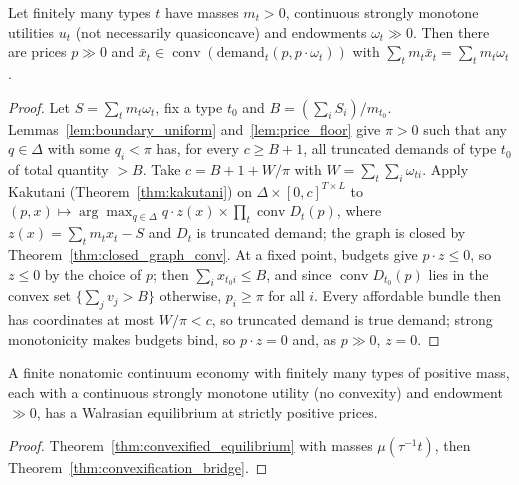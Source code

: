 \begin{theorem}
\label{thm:convexified_equilibrium}
\leanok
{}
Let finitely many types $t$ have masses $m_t > 0$, continuous strongly monotone utilities $u_t$ (not necessarily
quasiconcave) and endowments $\omega_t \gg 0$. Then there are prices $p \gg 0$ and $\bar x_t \in \operatorname{conv}
(\text{demand}_t(p, p\cdot\omega_t))$ with $\sum_t m_t \bar x_t = \sum_t m_t \omega_t$.
\end{theorem}
\begin{proof}
\leanok
Let $S = \sum_t m_t\omega_t$, fix a type $t_0$ and $B = (\sum_i S_i)/m_{t_0}$. Lemmas~\ref{lem:boundary_uniform}
and~\ref{lem:price_floor} give $\pi > 0$ such that any $q \in \Delta$ with some $q_i < \pi$ has, for every $c \ge B+1$,
all truncated demands of type $t_0$ of total quantity $> B$. Take $c = B + 1 + W/\pi$ with $W = \sum_t\sum_i \omega_{ti}$.
Apply Kakutani (Theorem~\ref{thm:kakutani}) on $\Delta \times [0,c]^{T\times L}$ to
$(p, x) \mapsto \arg\max_{q \in \Delta} q\cdot z(x) \times \prod_t \operatorname{conv} D_t(p)$, where
$z(x) = \sum_t m_t x_t - S$ and $D_t$ is truncated demand; the graph is closed by Theorem~\ref{thm:closed_graph_conv}.
At a fixed point, budgets give $p \cdot z \le 0$, so $z \le 0$ by the choice of $p$; then $\sum_i x_{t_0 i} \le B$, and
since $\operatorname{conv} D_{t_0}(p)$ lies in the convex set $\{\sum_j v_j > B\}$ otherwise, $p_i \ge \pi$ for all $i$.
Every affordable bundle then has coordinates at most $W/\pi < c$, so truncated demand is true demand; strong monotonicity
makes budgets bind, so $p\cdot z = 0$ and, as $p \gg 0$, $z = 0$.
\end{proof}

\begin{theorem}
\label{thm:aumann_existence}
\leanok
{}
A finite nonatomic continuum economy with finitely many types of positive mass, each with a continuous strongly monotone
utility (no convexity) and endowment $\gg 0$, has a Walrasian equilibrium at strictly positive prices.
\end{theorem}
\begin{proof}
\leanok
Theorem~\ref{thm:convexified_equilibrium} with masses $\mu(\tau^{-1}t)$, then Theorem~\ref{thm:convexification_bridge}.
\end{proof}


